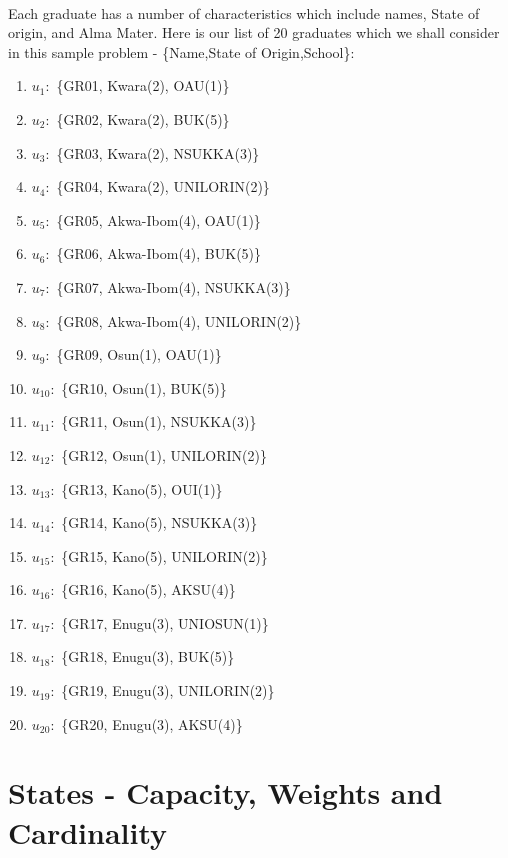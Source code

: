 \documentclass[a4paper,openany]{book}
\begin{document}
			\paragraph{}
				Each graduate has a number of characteristics which include names, State of origin, and Alma Mater. Here is our list of 20 graduates which we shall consider in this sample problem - \{Name,State of Origin,School\}:
				\begin{enumerate}[1.]
					\item $u_1\colon$ \{GR01, Kwara(2), OAU(1)\}
					\item $u_2\colon$ \{GR02, Kwara(2), BUK(5)\}
					\item $u_3\colon$ \{GR03, Kwara(2), NSUKKA(3)\}
					\item $u_4\colon$ \{GR04, Kwara(2), UNILORIN(2)\}
					\item $u_5\colon$ \{GR05, Akwa-Ibom(4), OAU(1)\}
					\item $u_6\colon$ \{GR06, Akwa-Ibom(4), BUK(5)\}
					\item $u_7\colon$ \{GR07, Akwa-Ibom(4), NSUKKA(3)\}
					\item $u_8\colon$ \{GR08, Akwa-Ibom(4), UNILORIN(2)\}
					\item $u_9\colon$ \{GR09, Osun(1), OAU(1)\}
					\item $u_{10}\colon$ \{GR10, Osun(1), BUK(5)\}
					\item $u_{11}\colon$ \{GR11, Osun(1), NSUKKA(3)\}
					\item $u_{12}\colon$ \{GR12, Osun(1), UNILORIN(2)\}
					\item $u_{13}\colon$ \{GR13, Kano(5), OUI(1)\}
					\item $u_{14}\colon$ \{GR14, Kano(5), NSUKKA(3)\}
					\item $u_{15}\colon$ \{GR15, Kano(5), UNILORIN(2)\}
					\item $u_{16}\colon$ \{GR16, Kano(5), AKSU(4)\}
					\item $u_{17}\colon$ \{GR17, Enugu(3), UNIOSUN(1)\}
					\item $u_{18}\colon$ \{GR18, Enugu(3), BUK(5)\}
					\item $u_{19}\colon$ \{GR19, Enugu(3), UNILORIN(2)\}
					\item $u_{20}\colon$ \{GR20, Enugu(3), AKSU(4)\}
				\end{enumerate}
		\section{States - Capacity, Weights and Cardinality}
\end{document}
